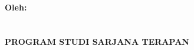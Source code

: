 \begin{titlepage}
    \begin{center}

        \begin{doublespace}
            \textbf{\MakeUppercase{\large{\tipe}}}\\[0.5cm]\textbf{\MakeUppercase{\normalsize{\judulid}}}\\[3cm]

        \end{doublespace}

        \\[2cm]

        \textbf{\normalsize {Oleh:}} \\
        \textbf{\normalsize \MakeUppercase{\penulis}} \\
        \textbf{\normalsize \MakeUppercase{{\nim}}} \\[3cm]


        \textbf{\normalsize \MakeUppercase{Program Studi Sarjana Terapan \\ \prodi}}\\
        \textbf{\normalsize \MakeUppercase{\departemen}}\\
        \textbf{\normalsize \MakeUppercase{\fakultas}}\\
        \textbf{\normalsize \MakeUppercase{\universitas}}\\
        \textbf{\normalsize \the\year{}}\\
    \end{center}
\end{titlepage}